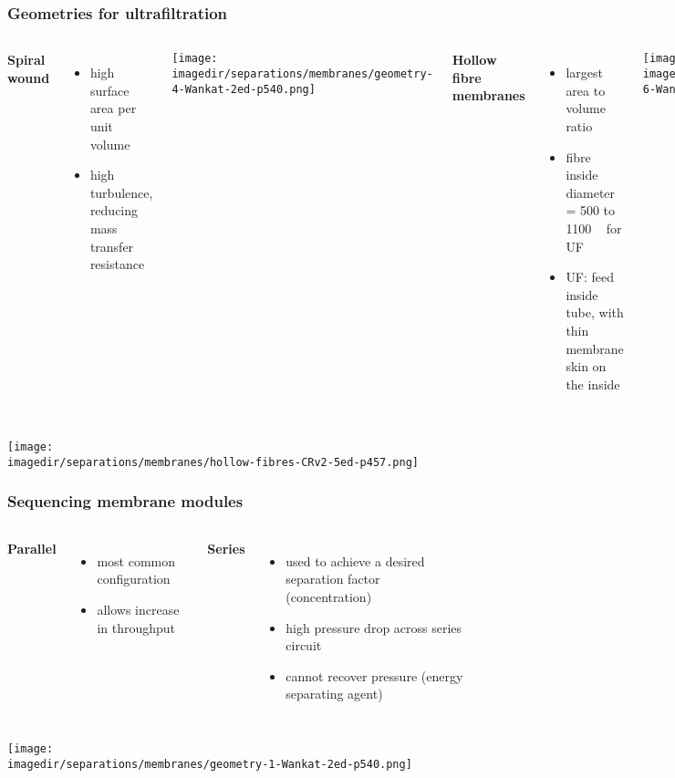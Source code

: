 \begin{frame}\frametitle{Geometries for ultrafiltration}
	\begin{columns}[t]
			\textbf{Spiral wound}

				\begin{itemize}
					\item	high surface area per unit volume
					\item	high turbulence, reducing mass transfer resistance
				\end{itemize}
			\vfill
			\begin{center}
				\texttt{[image: \\imagedir/separations/membranes/geometry-4-Wankat-2ed-p540.png]}
			\end{center}
			\textbf{Hollow fibre membranes}
			\begin{itemize}
				\item	largest area to volume ratio
				\item	fibre inside diameter = 500 to 1100 \micron~ for UF
				\item	UF: feed inside tube, with thin membrane skin on the inside
			\end{itemize}
			\begin{center}
				\texttt{[image: \\imagedir/separations/membranes/geometry-6-Wankat-2ed-p540.png]}
			\end{center}
	\end{columns}
\end{frame}

\begin{frame}\frametitle{}
	\begin{center}
		\texttt{[image: \\imagedir/separations/membranes/hollow-fibres-CRv2-5ed-p457.png]}
	\end{center}
\end{frame}

\begin{frame}\frametitle{Sequencing membrane modules}
	\begin{columns}[t]
			\textbf{Parallel}
			\begin{itemize}
				\item	most common configuration
				\item	allows increase in throughput
			\end{itemize}
			\textbf{Series}
			\begin{itemize}
				\item	used to achieve a desired separation factor (concentration)
				\item	high pressure drop across series circuit
				\item	cannot recover pressure (energy separating agent)
			\end{itemize}
	\end{columns}
	\begin{center}
		\texttt{[image: \\imagedir/separations/membranes/geometry-1-Wankat-2ed-p540.png]}
	\end{center}
\end{frame}

